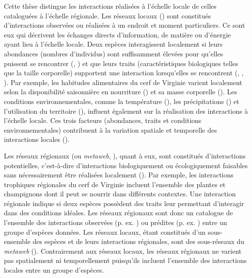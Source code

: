 Cette thèse distingue les interactions réalisées à l'échelle locale de celles
cataloguées à l'échelle régionale. Les réseaux locaux
(\cite{Poisot2012Dissimilarity}) sont constitués d'interactions observées ou
réalisées à un endroit et moment particuliers. Ce sont eux qui décrivent les
échanges directs d'information, de matière ou d'énergie ayant lieu à l'échelle
locale. Deux espèces interagissent localement si leurs abondances (nombres
d'individus) sont suffisamment élevées pour qu'elles puissent se rencontrer
(\cite{Canard2012Emergence}, \cite{Canard2014Empirical}) et que leurs traits
(caractéristiques biologiques telles que la taille corporelle) supportent une
interaction lorsqu'elles se rencontrent (\cite{Bolnick2011Why},
\cite{Gravel2013Inferring}, \cite{Stouffer2011Role}). Par exemple, les habitudes
alimentaires du cerf de Virginie varient localement selon la disponibilité
saisonnière en nourriture (\cite{Short1975Nutrition}) et sa masse corporelle
(\cite{Luna2013Influence}). Les conditions environnementales, comme la
température (\cite{Angilletta2004Temperature}), les précipitations
(\cite{Woodward2012Climate}) et l'utilisation du territoire
(\cite{Tylianakis2007Habitat}), influent également sur la réalisation des
interactions à l'échelle locale. Ces trois facteurs (abondances, traits et
conditions environnementales) contribuent à la variation spatiale et temporelle
des interactions locales (\cite{Poisot2015Species}). 

Les réseaux régionaux (ou \textit{metaweb}, \cite{Pascual2006Ecological}), quant
à eux, sont constitués d'interactions potentielles, c'est-à-dire d'interactions
biologiquement ou écologiquement faisables sans nécessairement être réalisées
localement (\cite{Tylianakis2017Ecological}). Par exemple, les interactions
trophiques régionales du cerf de Virginie incluent l'ensemble des plantes et
champignons dont il peut se nourrir dans différents contextes. Une interaction
régionale indique si deux espèces possèdent des traits leur permettant
d'interagir dans des conditions idéales. Les réseaux régionaux sont donc un
catalogue de l'ensemble des interactions observées (p. ex.
\cite{Maiorano2020Tetraeu}) ou prédites (p. ex. \cite{Strydom2022Food}) entre un
groupe d'espèces données. Les réseaux locaux, étant constitués d'un
sous-ensemble des espèces et de leurs interactions régionales, sont des
sous-réseaux du \textit{metaweb} (\cite{Saravia2022Ecological}). Contrairement
aux réseaux locaux, les réseaux régionaux ne varient pas spatialement ni
temporellement puisqu'ils incluent l'ensemble des interactions locales entre un
groupe d'espèces. 

